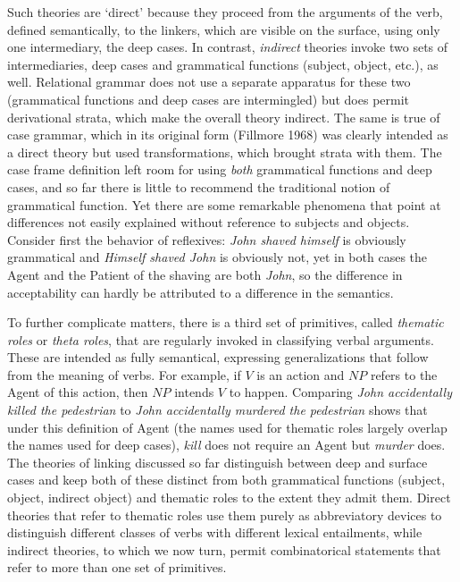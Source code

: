 Such theories are `direct' because they proceed from the arguments of the
verb, defined semantically, to the linkers, which are visible on the surface,
using only one intermediary, the deep cases. In contrast, {\it indirect}
theories invoke two sets of intermediaries, deep cases and grammatical
functions (subject, object, etc.), as well. Relational grammar does not use a
separate apparatus for these two (grammatical functions and deep cases are
intermingled) but does permit derivational strata, which make the overall
theory indirect. The same is true of case grammar, which in its original form
(Fillmore 1968) was clearly intended as a direct theory but used
transformations, which brought strata with them. The case frame definition
left room for using {\it both} grammatical functions and deep cases, and so
far there is little to recommend the traditional notion of grammatical
function.  Yet there are some remarkable phenomena that point at differences
not easily explained without reference to subjects and objects. Consider first
the behavior of reflexives: {\it John shaved himself} is obviously grammatical
and {\it *Himself shaved John} is obviously not, yet in both cases the Agent
and the Patient of the shaving are both {\it John}, so the difference in
acceptability can hardly be attributed to a difference in the semantics.

To further complicate matters, there is a third set of primitives, called {\it
  thematic roles} or {\it theta roles},   that are regularly invoked in classifying verbal arguments. These are
intended as fully semantical, expressing generalizations that follow from the
meaning of verbs. For example, if $V$ is an action and $NP$ refers to the
Agent of this action, then $NP$ intends $V$ to happen. Comparing {\it John
  accidentally killed the pedestrian} to {\it *John accidentally murdered the
  pedestrian} shows that under this definition of Agent (the names used for
thematic roles largely overlap the names used for deep cases), {\it kill} does
not require an Agent but {\it murder} does.  The theories of linking discussed
so far distinguish between deep and surface cases and keep both of these
distinct from both grammatical functions (subject, object, indirect object)
and thematic roles to the extent they admit them. Direct theories that 
refer to thematic roles use them purely as abbreviatory devices to distinguish 
different classes of verbs with different lexical entailments, while indirect 
theories, to which we now turn, permit combinatorical statements that refer 
to more than one set of primitives. 

